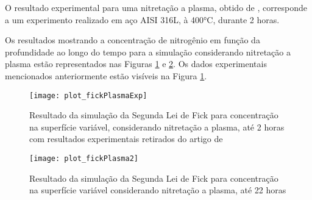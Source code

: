O resultado experimental para uma nitretação a plasma, obtido de \cite{moskalioviene2011modeling}, corresponde a um experimento realizado em aço AISI 316L, à 400°C, durante 2 horas.

Os resultados mostrando a concentração de nitrogênio em função da profundidade ao longo do tempo para a simulação considerando nitretação a plasma estão representados nas Figuras \ref{fig:csvar-plasma1} e \ref{fig:csvar-plasma2}. Os dados experimentais mencionados anteriormente estão visíveis na Figura \ref{fig:csvar-plasma1}.


\begin{figure}[!htb]
\centering
	\caption{Resultado da simulação da Segunda Lei de Fick para concentração na superfície variável, considerando nitretação a plasma, até 2 horas com resultados experimentais retirados do artigo de \cite{moskalioviene2011modeling}}
	\texttt{[image: plot\_fickPlasmaExp]}
	\label{fig:csvar-plasma1}
	\centering
\end{figure}

\begin{figure}[!htb]
\centering
	\caption{Resultado da simulação da Segunda Lei de Fick para concentração na superfície variável considerando nitretação a plasma, até 22 horas}
	\texttt{[image: plot\_fickPlasma2]}
	\label{fig:csvar-plasma2}
	\centering
\end{figure}

\FloatBarrier